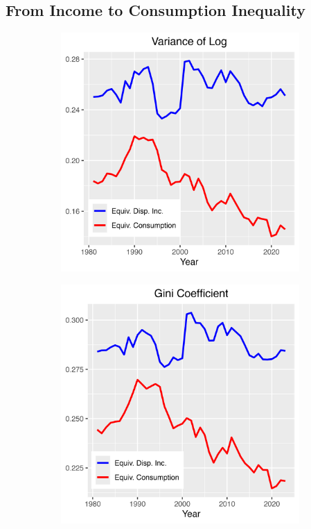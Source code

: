 \documentclass{article}
\begin{document}
\subsection{From Income to Consumption Inequality}

\begin{figure}
    \centering
    \begin{subfigure}[t]{0.475\textwidth}
        \centering
        \includegraphics[width=\textwidth]{figures/Fig_6/Fig_6a.png}
        \label{fig:Consumption_Var}
    \end{subfigure}
    \begin{subfigure}[t]{0.475\textwidth}
        \centering
        \includegraphics[width=\textwidth]{figures/Fig_6/Fig_6b.png}

\end{subfigure}
\end{figure}
\end{document}
